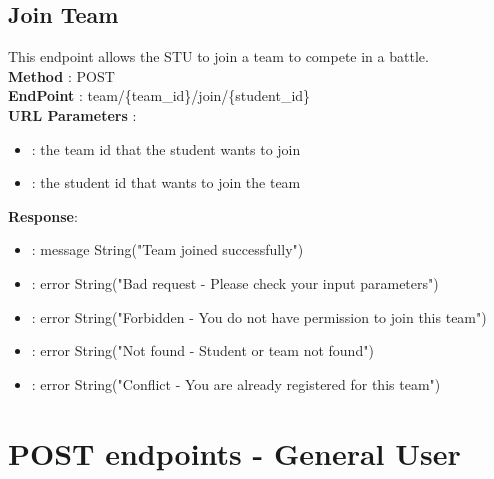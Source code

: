 \subsection*{Join Team}
This endpoint allows the STU to join a team to compete in a battle.\\
\textbf{Method} : POST \\
\textbf{EndPoint} : team/\{team\_id\}/join/\{student\_id\} \\
\textbf{URL Parameters} :
\begin{itemize}
    \item {} : the team id that the student wants to join
    \item {} : the student id that wants to join the team
\end{itemize}
\textbf{Response}:
\begin{itemize}
    \item {} : message String("Team joined successfully")
    \item {} : error String("Bad request - Please check your input parameters")
    \item {} : error String("Forbidden - You do not have permission to join this team")
    \item {} : error String("Not found - Student or team not found")
    \item {} : error String("Conflict - You are already registered for this team")
\end{itemize}

\section*{POST endpoints - General User}
